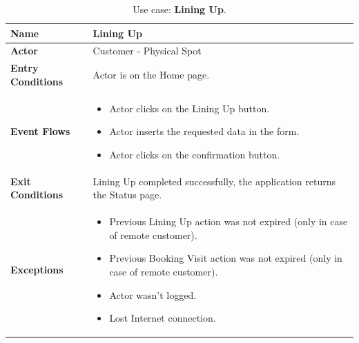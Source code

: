 \begin{table}[H]
\centering
\begin{tabular}{| m{} | m{} |} 
	\hline
	\textbf{Name} & Lining Up \\ 
	\hline
	\textbf{Actor} & Customer - Physical Spot \\ 
	\hline
	\textbf{Entry Conditions} & Actor is on the Home page. \\ 
	\hline
	\textbf{Event Flows} &
	\begin{itemize}
	\item Actor clicks on the Lining Up button.
	\item Actor inserts the requested data in the form.
	\item Actor clicks on the confirmation button.
	\end{itemize} \\ 
	\hline
	\textbf{Exit Conditions} & Lining Up completed successfully, the application returns the Status page. \\ 
	\hline
	\textbf{Exceptions} &
	\begin{itemize}
	\item Previous Lining Up action was not expired (only in case of remote customer).
	\item Previous Booking Visit action was not expired (only in case of remote customer).
	\item Actor wasn't logged.
	\item Lost Internet connection.
	\end{itemize} \\ 
	\hline
\end{tabular}
\caption{Use case: \textbf{Lining Up}.}
\label{tableLiningUp}
\end{table}

